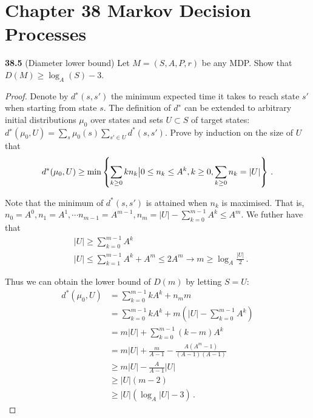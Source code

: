 \chapter*{Chapter 38 Markov Decision Processes}
\label{sec:thirty_eighth}

\noindent\textbf{38.5} (Diameter lower bound) Let $M = (S, A, P, r)$ be any MDP. Show that $D(M) \ge\log_A(S) - 3$.

\begin{proof}
Denote by $d^∗(s, s' )$ the minimum expected time it takes to reach state $s'$ when starting from
state $s$. The definition of $d^∗$ can be extended to arbitrary initial distributions $\mu_0$ over states and sets $U \subset S$ of target states: $d^∗(\mu_0,U) = \sum_s \mu_0(s) \sum_{s'\in U}d^*(s, s')$. Prove by induction on the size of $U$ that
\begin{align*}    
    d^*(\mu_0,U) \ge \min\left\{  \sum_{k\ge 0}k n_k\big| 0\le n_k \le A^k, k\ge0,\sum_{k\ge 0} n_k = |U| \right\} \,.
\end{align*}

Note that the minimum of $d^*(s,s')$ is attained when $n_k$ is maximised. That is, $n_0=A^0, n_1 = A^1,\cdots n_{m-1} = A^{m-1}, n_m = |U|-\sum_{k=0}^{m-1}A^k \leq A^m$. We futher have that
\begin{align*}
    &|U|\ge \sum_{k=0}^{m-1}A^k\\
    &|U| \leq \sum_{k=1}^{m-1}A^k + A^m \leq 2A^{m} \rightarrow m\ge \log_A\frac{|U|}{2}\,.
\end{align*}

Thus we can obtain the lower bound of $D(m)$ by letting $S=U$:
\begin{align*}
    d^*(\mu_0,U) &= \sum_{k=0}^{m-1}kA^k + n_m m\\
    &=\sum_{k=0}^{m-1}kA^k + m\left(|U|-\sum_{k=0}^{m-1}A^k\right)\\
    &= m|U| + \sum_{k=0}^{m-1}(k-m) A^k\\
    &=m|U| + \frac{m}{A-1} - \frac{A(A^m-1)}{(A-1)(A-1)}\\
    &\ge m|U| - \frac{A}{A-1} |U|\\
    &\ge |U|(m-2)\\
    &\ge |U|\left(\log_A|U|-3\right) \,.
\end{align*}
\end{proof}
